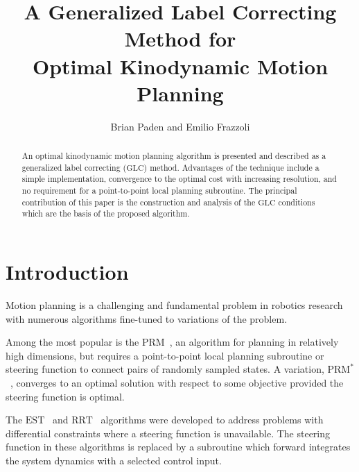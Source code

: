 \documentclass{llncs}
\newcommand{\GLC}{\ensuremath{\mathrm{GLC}}\xspace}
\newcommand{\PRM}{\ensuremath{\mathrm{PRM}}\xspace}
\newcommand{\PRMs}{\ensuremath{\mathrm{PRM}^*}\xspace}
\newcommand{\RRT}{\ensuremath{\mathrm{RRT}}\xspace}
\newcommand{\EST}{\ensuremath{\mathrm{EST}}\xspace}
\begin{document}
\title{A Generalized Label Correcting Method for \\ Optimal Kinodynamic Motion Planning }

\author{Brian Paden and Emilio Frazzoli}
\maketitle
\begin{abstract}
%
An optimal kinodynamic motion planning algorithm is presented and  described as a generalized label correcting (\GLC) method.
%
%
Advantages of the technique include a simple implementation, convergence to the optimal cost with increasing resolution, and no requirement for a point-to-point local planning subroutine.
%
The principal contribution of this paper is the construction and analysis of the \GLC conditions which are the basis of the proposed algorithm.
%
%
%

\end{abstract}
%

\section{Introduction}
Motion planning is a challenging and fundamental problem in robotics research with numerous algorithms fine-tuned to variations of the problem.
%

%
Among the most popular is the \PRM~\cite{PRM}, an algorithm for planning in relatively high dimensions, but requires a point-to-point local planning subroutine or steering function to connect pairs of randomly sampled states.
%
A variation, \PRMs~\cite{karaman2011sampling}, converges to an optimal solution with respect to some objective provided the steering function is optimal.
%

%
The \EST~\cite{EST_Journal} and \RRT~\cite{RRT_Journal} algorithms were developed to address problems with differential constraints where a steering function is unavailable.
%
The steering function in these algorithms is replaced by a subroutine which forward integrates the system dynamics with a selected control input.
%
\end{document}
